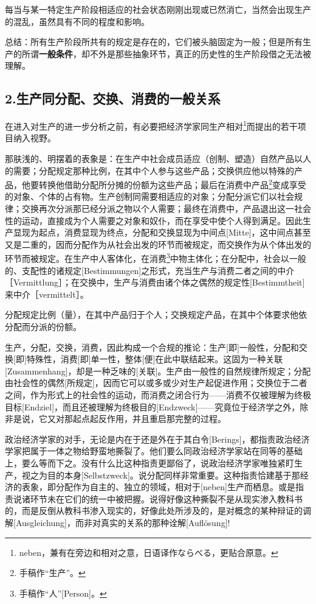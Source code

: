 \documentclass[a4paper,twoside,12pt]{ctexart}
\begin{document}
每当与某一特定生产阶段相适应的社会状态刚刚出现或已然消亡，当然会出现生产的混乱，虽然具有不同的程度和影响。

总结：所有生产阶段所共有的规定是存在的，它们被头脑固定为一般；但是所有生产的所谓\textbf{一般条件}，却不外是那些抽象环节，真正的历史性的生产阶段借之无法被理解。

\newpage

\subsection{2.生产同分配、交换、消费的一般关系}

在进入对生产的进一步分析之前，有必要把经济学家同生产相对\footnote{neben，兼有在旁边和相对之意，日语译作ならべる，更贴合原意。}而提出的若干项目纳入视野。

那肤浅的、明摆着的表象是：在生产中社会成员适应（创制、塑造）自然产品以人的需要；分配规定那种比例，在其中个人参与这些产品；交换供应他以特殊的产品，他要转换他借助分配所分摊的份额为这些产品；最后在消费中产品\footnote{手稿作“生产”。}变成享受的对象、个体的占有物。生产创制同需要相适应的对象；分配分派它们以社会规律；交换再次分派那已经分派之物以个人需要；最终在消费中，产品退出这一社会性的运动，直接成为个人需要之对象和奴仆，而在享受中使个人得到满足。因此生产显现为起点，消费显现为终点，分配和交换显现为中间点[Mitte]，这中间点甚至又是二重的，因而分配作为从社会出发的环节而被规定，而交换作为从个体出发的环节而被规定。在生产中人客体化，在消费\footnote{手稿作“人”[Person]。}中物主体化；在分配中，社会以一般的、支配性的诸规定[Bestimmungen]之形式，充当生产与消费二者之间的中介［Vermittlung］；在交换中，生产与消费由诸个体之偶然的规定性[Bestimmtheit]来中介［vermittelt］。

分配规定比例（量），在其中产品归于个人；交换规定产品，在其中个体要求他依分配而分派的份额。

生产，分配，交换，消费，因此构成一个合规的推论：生产[即]一般性，分配和交换[即]特殊性，消费[即]单一性，整体[便]在此中联结起来。这固为一种关联[Zusammenhang]，却是一种乏味的[关联]。生产由一般性的自然规律所规定；分配由社会性的偶然[所规定]，因而它可以或多或少对生产起促进作用；交换位于二者之间，作为形式上的社会性的运动，而消费之闭合行为——消费不仅被理解为终极目标[Endziel]，而且还被理解为终极目的[Endzweck]——究竟位于经济学之外，除非是说，它又对那起点起反作用，并且重启那完整的过程。

政治经济学家的对手，无论是内在于还是外在于其白令[Berings]，都指责政治经济学家把属于一体之物给野蛮地撕裂了。他们要么同政治经济学家站在同等的基础上，要么等而下之。没有什么比这种指责更鄙俗了，说政治经济学家唯独紧盯生产，视之为目的本身[Selbstzweck]。说分配同样非常重要。这种指责恰建基于那经济的表象，即分配作为自主的、独立的领域，相对于[neben]生产而栖息。或是指责说诸环节未在它们的统一中被把握。说得好像这种撕裂不是从现实渗入教科书的，而是反倒从教科书渗入现实的，好像此处所涉及的，是对概念的某种辩证的调解[Ausgleichung]，而非对真实的关系的那种诠解[Auflösung]!
\end{document}
